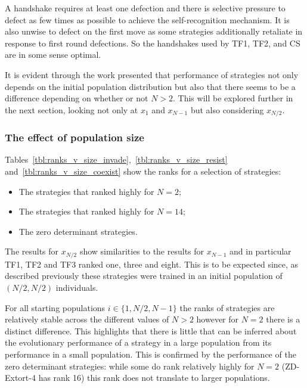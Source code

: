 \documentclass[10pt,letterpaper]{article}
\begin{document}
A handshake requires at least one defection and there is
selective pressure to defect as few times as possible to achieve the
self-recognition mechanism. It is also unwise to defect on the first move as
some strategies additionally retaliate in response to first round defections. So the
handshakes used by TF1, TF2, and CS are in some sense optimal.

It is evident through
the work presented that performance of strategies not only depends
on the initial population distribution but also that there seems to be a
difference depending on whether or not \(N>2\). This will be explored further in
the next section, looking not only at \(x_1\) and \(x_{N-1}\) but also
considering
\(x_{N/2}\).

\subsubsection*{The effect of population size}

Tables~\ref{tbl:ranks_v_size_invade},~\ref{tbl:ranks_v_size_resist}
and~\ref{tbl:ranks_v_size_coexist} show the ranks for a selection of
strategies:

\begin{itemize}
    \item The strategies that ranked highly for \(N=2\);
    \item The strategies that ranked highly for \(N=14\);
    \item The zero determinant strategies.
\end{itemize}

The results for \(x_{N/2}\) show similarities to the results for \(x_{N-1}\) and
in particular TF1, TF2 and TF3 ranked one, three and eight. This is to be
expected since, as described previously these strategies
were trained in an initial population of \((N/2, N/2)\) individuals.

For all starting populations
\(i\in\{1, N/2, N-1\}\) the ranks of strategies are relatively stable across the
different values of \(N>2\) however for \(N=2\) there is a distinct difference.
This highlights that there is little that can be inferred about the evolutionary
performance of a strategy in a large population from its performance in a small
population. This is confirmed by the performance of the zero determinant strategies: while
some do rank relatively highly for \(N=2\) (ZD-Extort-4 has rank 16) this rank
does not translate to larger populations.
\end{document}

